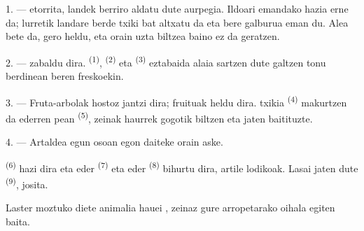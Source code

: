 %
%


\VUsaut{5.0mm}
\VUsaut{3.0mm}
\VUsaut{3.0mm}
\VUsaut{4.0mm}
\VUsaut{3.0mm}

1. ---  etorrita, landek berriro aldatu dute aurpegia. Ildoari
emandako hazia erne da; lurretik landare berde txiki bat altxatu da eta bere
galburua eman du. Alea bete da, gero heldu, eta orain uzta biltzea baino ez da
geratzen.

2. ---  zabaldu dira. 
\textsuperscript{(1)},  \textsuperscript{(2)} eta
 \textsuperscript{(3)} eztabaida alaia sartzen dute galtzen
tonu berdinean beren  freskoekin.

3. --- Fruta-arbolak hostoz jantzi dira; fruituak heldu dira. 
txikia \textsuperscript{(4)} makurtzen da  ederren pean
\textsuperscript{(5)}, zeinak haurrek gogotik biltzen eta jaten baitituzte.

4. --- Artaldea egun osoan egon daiteke orain aske.

 \textsuperscript{(6)} hazi dira eta  eder
\textsuperscript{(7)} eta  eder \textsuperscript{(8)} bihurtu dira,
artile lodikoak. Lasai jaten dute  
\textsuperscript{(9)},  josita.

Laster moztuko diete animalia hauei , zeinaz gure arropetarako
oihala egiten baita.

